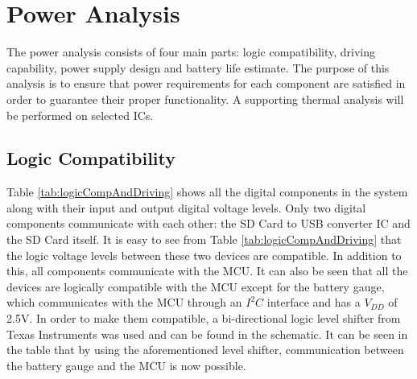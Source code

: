 \section{Power Analysis}
The power analysis consists of four main parts: logic compatibility, driving capability, power supply design and battery life estimate. The purpose of this analysis is to ensure that power requirements for each component are satisfied in order to guarantee their proper functionality. A supporting thermal analysis will be performed on selected ICs.

\subsection{Logic Compatibility}

Table \ref{tab:logicCompAndDriving} shows all the digital components in the system along with their input and output digital voltage levels.  Only two digital components communicate with each other: the SD Card to USB converter IC and the SD Card itself.  It is easy to see from Table \ref{tab:logicCompAndDriving} that the logic voltage levels between these two devices are compatible.  In addition to this, all components communicate with the MCU.  It can also be seen that all the devices are logically compatible with the MCU except for the battery gauge, which communicates with the MCU through an $I^2C$ interface and has a $V_{DD}$ of 2.5V.  In order to make them compatible, a bi-directional logic level shifter from Texas Instruments was used and can be found in the schematic.  It can be seen in the table that by using the aforementioned level shifter, communication between the battery gauge and the MCU is now possible.


